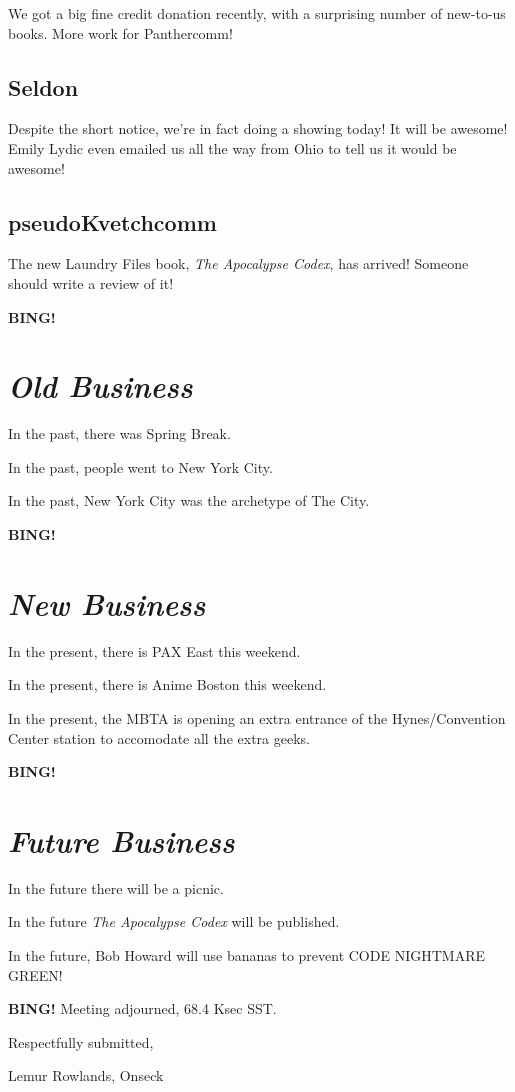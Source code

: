\documentclass[10pt]{article}
\newcommand{\bing}{{\bf BING!} }
\newcommand{\goto}[1]{\bing \vskip 12pt \section*{{\em{#1}}}}
\newcommand{\onseck}{Lemur Rowlands, Onseck}
\begin{document}
We got a big fine credit donation recently, with a surprising
number of new-to-us books.  More work for Panthercomm!


\subsection*{Seldon}

Despite the short notice, we're in fact doing a showing today!
It will be awesome!  Emily Lydic even emailed us all the way
from Ohio to tell us it would be awesome!


\subsection*{pseudoKvetchcomm}

The new Laundry Files book, \emph{The Apocalypse Codex}, has
arrived!  Someone should write a review of it!


\goto{Old Business}

In the past, there was Spring Break.

In the past, people went to New York City.

In the past, New York City was the archetype of The City.


\goto{New Business}

In the present, there is PAX East this weekend.

In the present, there is Anime Boston this weekend.

In the present, the MBTA is opening an extra entrance
of the Hynes/Convention Center station to accomodate all
the extra geeks.


\goto{Future Business}

In the future there will be a picnic.

In the future \emph{The Apocalypse Codex} will be published.

In the future, Bob Howard will use bananas to prevent CODE
NIGHTMARE GREEN!

\bing
\noindent
Meeting adjourned, 68.4 Ksec SST.

\vspace{18pt}

\centerline{Respectfully submitted,}
\centerline{\onseck}
\end{document}
